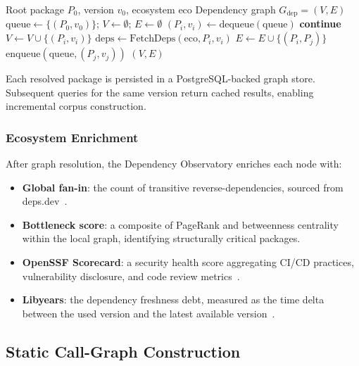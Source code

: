 \documentclass[conference]{IEEEtran}
\begin{document}
\begin{algorithm}[t]
\caption{Transitive Dependency Resolution}
\label{alg:bfs}
\begin{algorithmic}[1]
\REQUIRE Root package $P_0$, version $v_0$, ecosystem $\mathrm{eco}$
\ENSURE Dependency graph $G_{\mathrm{dep}} = (V, E)$
\STATE $\mathrm{queue} \gets \{(P_0, v_0)\}$; $V \gets \emptyset$; $E \gets \emptyset$
    \STATE $(P_i, v_i) \gets \mathrm{dequeue}(\mathrm{queue})$
        \STATE \textbf{continue}
    \ENDIF
    \STATE $V \gets V \cup \{(P_i, v_i)\}$
    \STATE $\mathrm{deps} \gets \mathrm{FetchDeps}(\mathrm{eco}, P_i, v_i)$
        \STATE $E \gets E \cup \{(P_i, P_j)\}$
        \STATE $\mathrm{enqueue}(\mathrm{queue}, (P_j, v_j))$
    \ENDFOR
\ENDWHILE
\RETURN $(V, E)$
\end{algorithmic}
\end{algorithm}

Each resolved package is persisted in a PostgreSQL-backed graph store. Subsequent queries for the same version return cached results, enabling incremental corpus construction.

\subsubsection{Ecosystem Enrichment}

After graph resolution, the Dependency Observatory enriches each node with:
\begin{itemize}
    \item \textbf{Global fan-in}: the count of transitive reverse-dependencies, sourced from deps.dev~\cite{depsdev}.
    \item \textbf{Bottleneck score}: a composite of PageRank and betweenness centrality within the local graph, identifying structurally critical packages.
    \item \textbf{OpenSSF Scorecard}: a security health score aggregating CI/CD practices, vulnerability disclosure, and code review metrics~\cite{openssf}.
    \item \textbf{Libyears}: the dependency freshness debt, measured as the time delta between the used version and the latest available version~\cite{cox2015measuring}.
\end{itemize}

\subsection{Static Call-Graph Construction}
\label{subsec:call-graph}
\end{document}
